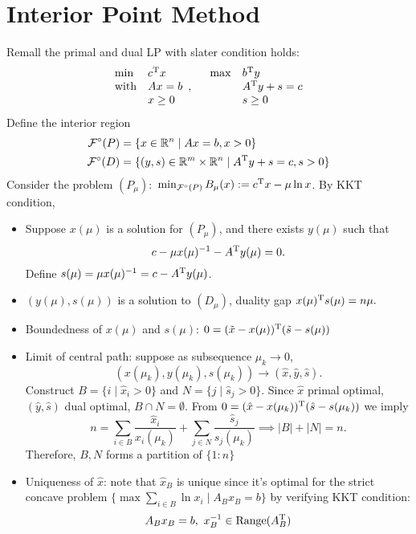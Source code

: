 \section{Interior Point Method}
Remall the primal and dual LP with slater condition holds:
\[
\begin{array}{ll}
\min&c^{\mathrm T} x\\
\text{with}&Ax=b\\
&x\ge0
\end{array},\quad
\begin{array}{ll}
\max&b^{\mathrm T} y\\
&A^{\mathrm T} y+s=c\\
&s\ge0
\end{array}
\]
Define the interior region
\begin{align*}
\mathcal{F}^\circ(P)&=\{x\in\mathbb{R}^n\mid Ax=b,x>0\}\\
\mathcal{F}^\circ(D)&=\{(y,s)\in\mathbb{R}^m\times\mathbb{R}^n\mid A^{\mathrm T} y+s=c,s>0\}
\end{align*}
Consider the problem $(P_\mu):$ $\min_{\mathcal{F}^\circ(P)}B_\mu(x):=c^{\mathrm T} x-\mu\ln x$. By KKT condition,
\begin{itemize}
\item
Suppose $x(\mu)$ is a solution for $(P_\mu)$, and there exists $y(\mu)$ such that 
\[
c - \mu x(\mu)^{-1}-A^{\mathrm T} y(\mu)=0.
\]
Define $s(\mu)=\mu x(\mu)^{-1} = c-A^{\mathrm T} y(\mu)$.
\item
$(y(\mu),s(\mu))$ is a solution to $(D_\mu)$, 
duality gap
$
x(\mu)^{\mathrm T} s(\mu)=n\mu.
$
\item
Boundedness of $x(\mu)$ and $s(\mu)$: $0=(\tilde{x} - x(\mu))^{\mathrm T}(\tilde{s} - s(\mu))$
\item
Limit of central path: suppose as subsequence $\mu_k\to0$, 
\[(x(\mu_k),y(\mu_k),s(\mu_k))\to(\hat{x},\hat{y},\hat{s}).\]
Construct $B=\{i\mid \hat{x}_i>0\}$ and $N=\{j\mid\hat{s}_j>0\}$.
Since $\hat{x}$ primal optimal, $(\hat{y},\hat{s})$ dual optimal, $B\cap N=\emptyset$.
From $0=(\hat{x}-x(\mu_k))^{\mathrm T}(\hat{s} - s(\mu_k))$ we imply
\[
n = \sum_{i\in B}\frac{\hat{x}_i}{x_i(\mu_k)}+\sum_{j\in N}\frac{\hat{s}_j}{s_j(\mu_k)}
\implies
|B|+|N|=n.
\]
Therefore, $B,N$ forms a partition of $\{1:n\}$
\item
Uniqueness of $\hat{x}$: note that $\hat{x}_B$ is unique since it's optimal for the strict concave problem $\{\max\sum_{i\in B}\ln x_i\mid A_Bx_B=b\}$ by verifying KKT condition:
\[
A_Bx_B=b,\
x_B^{-1}\in\text{Range}(A_B^{\mathrm T})
\]
\end{itemize}


